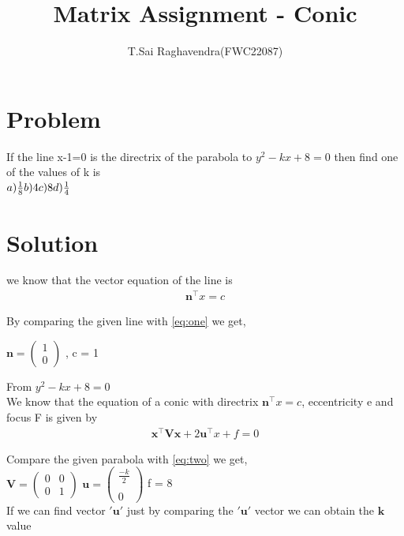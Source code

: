 \documentclass[journal,12pt,twocolumn]{IEEEtran}
\title{\mytitle}
\title{
Matrix Assignment - Conic
}
\author{T.Sai Raghavendra(FWC22087)}
\newcommand{\myvec}[1]{\ensuremath{\begin{pmatrix}#1\end{pmatrix}}}
\let\vec\mathbf
\begin{document}
\maketitle
\tableofcontents
\bigskip


\section{Problem}
If the line x-1=0 is the directrix of the parabola to $y^2-kx+8=0$ then find one of the values of k is\\
 $a)\frac{1}{8} \\ b)4 \\ c)8 \\ d)\frac{1}{4}$ 


\section{Solution}

we know that the vector equation of the line is 
\begin{align}
\label{eq:one}
\vec{n}^\top x = c
\end{align}

By comparing the given line with \eqref{eq:one} we get, 

\begin{center}
$\vec{n} = \myvec{1\\0}$ , c = 1 \\
\end{center}

From $y^2-kx+8=0$ \\

We know that the equation of a conic with directrix $\vec{n}^\top x = c$, eccentricity e and focus F is given by 
\begin{align}
\label{eq:two}
\vec{x^\top Vx}+2\vec{u^\top}x+f = 0 
\end{align}

Compare the given parabola with \eqref{eq:two} we get,\\

$\vec{V} = \myvec{0&0\\0&1}$ $\vec{u} = \myvec{\frac{-k}{2} \\ \\ 0}$ \vspace*{0.2cm} f = 8\\

If we can find vector $\vec{'u'}$ just by comparing the $\vec{'u'}$ vector we can obtain the $\vec{k}$ value\\ 
\end{document}
